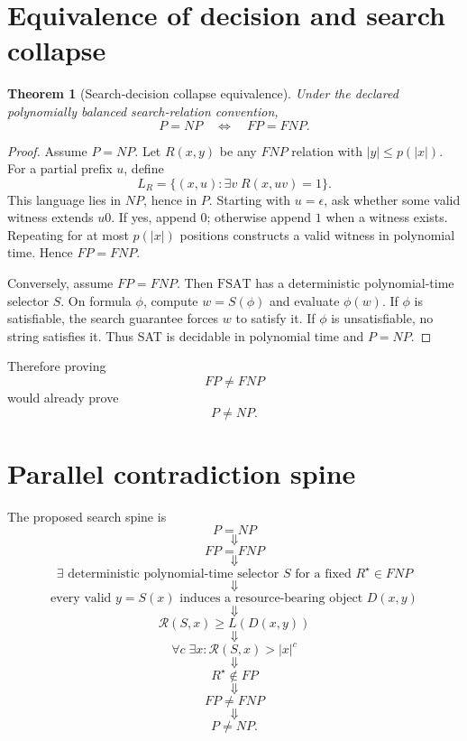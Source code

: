 \documentclass[11pt]{article}
\newtheorem{theorem}{Theorem}
\newcommand{\FSAT}{\mathrm{FSAT}}
\begin{document}
\section{Equivalence of decision and search collapse}

\begin{provedbox}
\begin{theorem}[Search-decision collapse equivalence]
Under the declared polynomially balanced search-relation convention,
\[
\boxed{P=NP\quad\Longleftrightarrow\quad FP=FNP.}
\]
\end{theorem}

\begin{proof}
Assume \(P=NP\). Let \(R(x,y)\) be any \(FNP\) relation with \(|y|\le p(|x|)\). For a partial
prefix \(u\), define
\[
L_R=\{(x,u):\exists v\;R(x,uv)=1\}.
\]
This language lies in \(NP\), hence in \(P\). Starting with \(u=\epsilon\), ask whether some valid
witness extends \(u0\). If yes, append \(0\); otherwise append \(1\) when a witness exists. Repeating
for at most \(p(|x|)\) positions constructs a valid witness in polynomial time. Hence \(FP=FNP\).

Conversely, assume \(FP=FNP\). Then \(\FSAT\) has a deterministic polynomial-time selector \(S\).
On formula \(\phi\), compute \(w=S(\phi)\) and evaluate \(\phi(w)\). If \(\phi\) is satisfiable, the
search guarantee forces \(w\) to satisfy it. If \(\phi\) is unsatisfiable, no string satisfies it.
Thus SAT is decidable in polynomial time and \(P=NP\).
\end{proof}
\end{provedbox}

Therefore proving
\[
FP\neq FNP
\]
would already prove
\[
P\neq NP.
\]

\section{Parallel contradiction spine}

The proposed search spine is
\[
\boxed{P=NP}
\]
\[
\Downarrow
\]
\[
\boxed{FP=FNP}
\]
\[
\Downarrow
\]
\[
\boxed{\exists\text{ deterministic polynomial-time selector }S\text{ for a fixed }R^\star\in FNP}
\]
\[
\Downarrow
\]
\[
\boxed{\text{every valid }y=S(x)\text{ induces a resource-bearing object }D(x,y)}
\]
\[
\Downarrow
\]
\[
\boxed{\mathcal R(S,x)\ge L(D(x,y))}
\]
\[
\Downarrow
\]
\[
\boxed{\forall c\;\exists x:\mathcal R(S,x)>|x|^c}
\]
\[
\Downarrow
\]
\[
\boxed{R^\star\notin FP}
\]
\[
\Downarrow
\]
\[
\boxed{FP\neq FNP}
\]
\[
\Downarrow
\]
\[
\boxed{P\neq NP}.
\]
\end{document}
